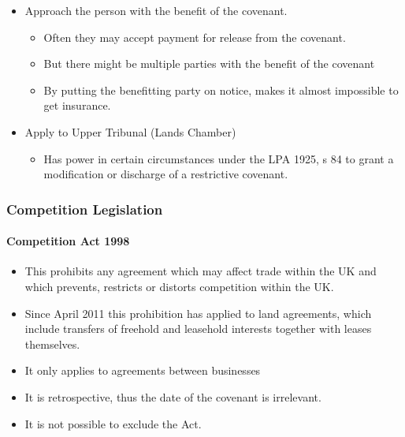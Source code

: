 \documentclass[
]{article}
\providecommand{\tightlist}{%
  \setlength{\itemsep}{0pt}\setlength{\parskip}{0pt}}
\begin{document}
\begin{itemize}
\tightlist
\item
  Approach the person with the benefit of the covenant.

  \begin{itemize}
  \tightlist
  \item
    Often they may accept payment for release from the covenant.
  \item
    But there might be multiple parties with the benefit of the covenant
  \item
    By putting the benefitting party on notice, makes it almost
    impossible to get insurance.
  \end{itemize}
\item
  Apply to Upper Tribunal (Lands Chamber)

  \begin{itemize}
  \tightlist
  \item
    Has power in certain circumstances under the LPA 1925, s 84 to grant
    a modification or discharge of a restrictive covenant.
  \end{itemize}
\end{itemize}

\hypertarget{competition-legislation}{%
\subsubsection{Competition Legislation}\label{competition-legislation}}

\hypertarget{competition-act-1998}{%
\paragraph{Competition Act 1998}\label{competition-act-1998}}

\begin{itemize}
\tightlist
\item
  This prohibits any agreement which may affect trade within the UK and
  which prevents, restricts or distorts competition within the UK.
\item
  Since April 2011 this prohibition has applied to land agreements,
  which include transfers of freehold and leasehold interests together
  with leases themselves.
\item
  It only applies to agreements between businesses
\item
  It is retrospective, thus the date of the covenant is irrelevant.
\item
  It is not possible to exclude the Act.
\end{itemize}
\end{document}
